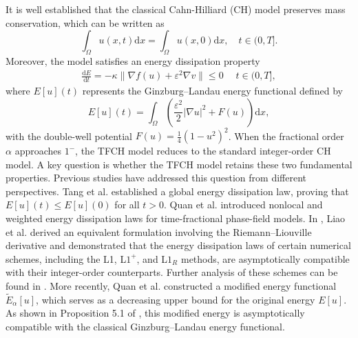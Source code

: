 \documentclass{siamart171218}
\theoremstyle{remark}
\theoremstyle{example}
\numberwithin{equation}{section}
\begin{document}
It is well established that the classical Cahn-Hilliard (CH) model \cite{Elliott} preserves mass conservation, which can be written as
\begin{equation}\label{eq.1.4}
\int_\Omega u(x,t) \mathrm{d}x = \int_\Omega u(x,0) \mathrm{d}x, \quad t \in (0,T].
\end{equation}
Moreover, the model satisfies an energy dissipation property
\begin{align*}
\frac{ \mathrm{d}E}{\mathrm{d}t}=-\kappa \|\nabla f(u)+ \varepsilon^2 \nabla v\| \leq 0 \;  \quad t \in (0,T],
\end{align*}
where $E[u](t)$ represents the Ginzburg–Landau energy functional defined by
\begin{equation}\label{eq.1.6}
E[u](t) = \int_\Omega \left( \frac{\varepsilon^2}{2}|\nabla u|^2 + F(u) \right) \mathrm{d}x,
\end{equation}
with the double-well potential $F(u) = \frac{1}{4}(1 - u^2)^2$. When the fractional order $\alpha$ approaches $1^-$, the TFCH model reduces to the standard integer-order CH model. A key question is whether the TFCH model retains these two fundamental properties.
Previous studies have addressed this question from different perspectives. Tang et al. \cite{Tang} established a global energy dissipation law, proving that $E[u](t)\leq E[u](0)$ for all $t > 0$. Quan et al. \cite{Quan1} introduced nonlocal and weighted energy dissipation laws for time-fractional phase-field models. In \cite{Liao2021}, Liao et al. derived an equivalent formulation involving the Riemann–Liouville derivative and demonstrated that the energy dissipation laws of certain numerical schemes, including the L1, L$1^+$, and L$1_R$ methods, are asymptotically compatible with their integer-order counterparts. Further analysis of these schemes can be found in \cite{Ji,Liao1,Liao2}. More recently, Quan et al. \cite{Quan2} constructed a modified energy functional $\widetilde{E}_\alpha[u]$, which serves as a decreasing upper bound for the original energy $E[u]$. As shown in Proposition 5.1 of \cite{Quan2}, this modified energy is asymptotically compatible with the classical Ginzburg–Landau energy functional.
\end{document}
